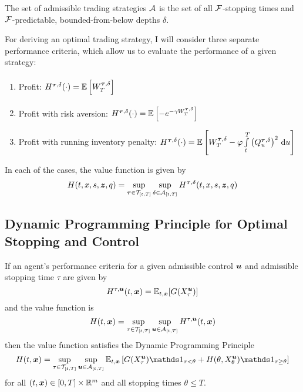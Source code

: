 The set of admissible trading strategies $\mathcal{A}$ is the set of all $\mathcal{F}$-stopping times and $\mathcal{F}$-predictable, bounded-from-below depths $\delta$. 

For deriving an optimal trading strategy, I will consider three separate performance criteria, which allow us to evaluate the performance of a given strategy:
\begin{enumerate}[noitemsep, topsep=0pt]
\item Profit: $H^{\bm{\tau}, \delta}(\cdot) = \mathbb{E} \left[ W_T^{\bm{\tau}, \delta} \right]\vphantom{\int\limits_t^T}$
\item Profit with risk aversion: $H^{\bm{\tau}, \delta}(\cdot) = \mathbb{E} \left[ - e^{-\gamma W_T^{\bm{\tau}, \delta}} \right] $
\item Profit with running inventory penalty: $H^{\bm{\tau}, \delta}(\cdot) = \mathbb{E} \left[  W_T^{\bm{\tau}, \delta}  - \varphi \int\limits_t^T \left( Q^{\bm{\tau}, \delta}_u \right)^2 \,\mathrm{d}u  \right]$
\end{enumerate}

In each of the cases, the value function is given by
\begin{equation}\label{eq:valuefunction}
H(t,x,s,\bm{z},q) = \sup\limits_{\bm{\tau} \in \mathcal{T}_{[t,T]}} \sup\limits_{\delta \in \mathcal{A}_{[t,T]}} H^{\bm{\tau}, \delta}(t,x,s,\bm{z},q)
\end{equation}

\subsection{Dynamic Programming Principle for Optimal Stopping and Control}
\begin{theorem}
If an agent's performance criteria for a given admissible control $\bm{u}$ and admissible stopping time $\tau$ are given by
\[ H^{\tau, \bm{u}}(t,\bm{x}) = \mathbb{E}_{t,\bm{x}} [ G (X^{\bm{u}}_\tau)] \]
and the value function is
\[ H(t,\bm{x}) = \sup\limits_{\tau \in \mathcal{T}_{[t,T]}} \sup\limits_{\bm{u} \in \mathcal{A}_{[t,T]}} H^{\tau, \bm{u}}(t,\bm{x}) \]
then the value function satisfies the Dynamic Programming Principle
\begin{equation}
\label{eq:thmDPP}
H(t,\bx) = \sup\limits_{\tau \in \mathcal{T}_{[t,T]}} \sup\limits_{\bu \in \cA_{[t,T]}} \E_{t,\bx} \left[ G (X^{\bu}_\tau) \indicator_{\tau<\theta} + H(\theta, X^{\bu}_\theta)\indicator_{\tau \geq \theta} \right]
\end{equation}
for all $(t,\bm{x}) \in [0,T] \times \mathbb{R}^m$ and all stopping times $\theta \leq T$.
\end{theorem}

